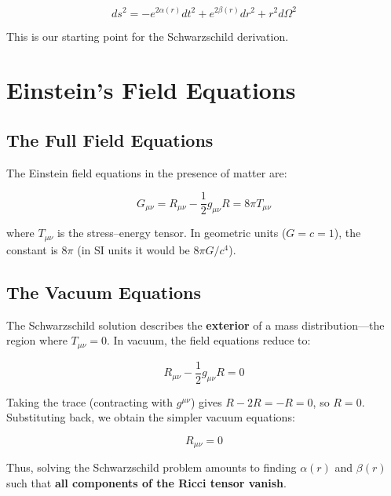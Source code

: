 \documentclass[12pt]{article}
\theoremstyle{definition}
\theoremstyle{remark}
\begin{document}
\begin{equation}\label{eq:static-spherical}
  ds^{2} = -e^{2\alpha(r)}dt^{2} + e^{2\beta(r)}dr^{2} + r^{2}d\Omega^{2}
\end{equation}

This is our starting point for the Schwarzschild derivation.

\section{Einstein's Field Equations}

\subsection{The Full Field Equations}

The Einstein field equations in the presence of matter are:

\begin{equation}\label{eq:efe-full}
  G_{\mu\nu} = R_{\mu\nu} - \frac{1}{2}g_{\mu\nu}R = 8\pi T_{\mu\nu}
\end{equation}

where $T_{\mu\nu}$ is the stress--energy tensor. In geometric units ($G=c=1$), the constant is $8\pi$ (in SI units it would be $8\pi G/c^{4}$).

\subsection{The Vacuum Equations}

The Schwarzschild solution describes the \textbf{exterior} of a mass distribution---the region where $T_{\mu\nu} = 0$. In vacuum, the field equations reduce to:

\begin{equation}\label{eq:efe-vacuum}
  R_{\mu\nu} - \frac{1}{2}g_{\mu\nu}R = 0
\end{equation}

Taking the trace (contracting with $g^{\mu\nu}$) gives $R - 2R = -R = 0$, so $R = 0$. Substituting back, we obtain the simpler vacuum equations:

\begin{equation}\label{eq:ricci-vacuum}
  R_{\mu\nu} = 0
\end{equation}

Thus, solving the Schwarzschild problem amounts to finding $\alpha(r)$ and $\beta(r)$ such that \textbf{all components of the Ricci tensor vanish}.
\end{document}
